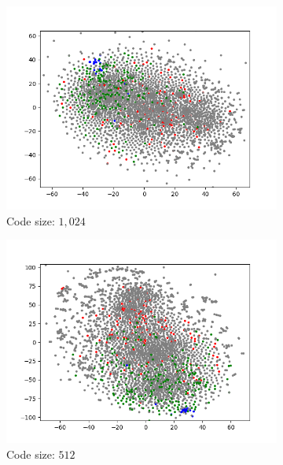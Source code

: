 \begin{figure}[H]
\begin{subfigure}{.25\textwidth}
        \includegraphics[width=\textwidth]{images/figures/experiments_latent/pooling_dim1024_classes.png}
        \caption{Code size: $1,024$}
    \end{subfigure}%
    \begin{subfigure}{.25\textwidth}
        \centering
        \includegraphics[width=\textwidth]{images/figures/experiments_latent/pooling_dim512_classes.png}
        \caption{Code size: $512$}
    \end{subfigure}%
    \begin{subfigure}{.25\textwidth}
        \centering

\end{subfigure}
\end{figure}
